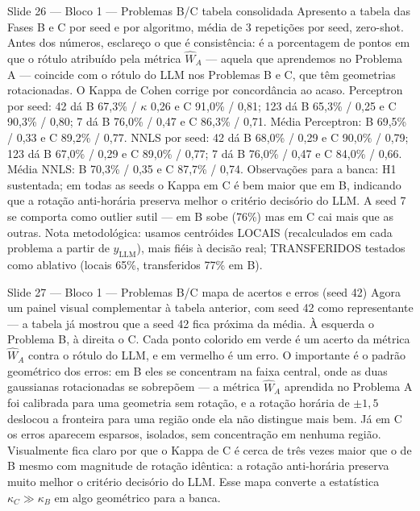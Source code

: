 \documentclass[aspectratio=169,10pt]{beamer}
\begin{document}
\begin{frame}{Slide 26 --- Bloco 1 --- Problemas B/C tabela consolidada}
\footnotesize
Apresento a tabela das Fases B e C por seed e por algoritmo, m\'edia de 3 repeti\c{c}\~oes por seed, zero-shot. Antes dos n\'umeros, esclare\c{c}o o que \'e consist\^encia: \'e a porcentagem de pontos em que o r\'otulo atribu\'ido pela m\'etrica $\hat W_A$ --- aquela que aprendemos no Problema A --- coincide com o r\'otulo do LLM nos Problemas B e C, que t\^em geometrias rotacionadas. O Kappa de Cohen corrige por concord\^ancia ao acaso. Perceptron por seed: 42 d\'a B 67,3\% / $\kappa$ 0,26 e C 91,0\% / 0,81; 123 d\'a B 65,3\% / 0,25 e C 90,3\% / 0,80; 7 d\'a B 76,0\% / 0,47 e C 86,3\% / 0,71. M\'edia Perceptron: B 69,5\% / 0,33 e C 89,2\% / 0,77. NNLS por seed: 42 d\'a B 68,0\% / 0,29 e C 90,0\% / 0,79; 123 d\'a B 67,0\% / 0,29 e C 89,0\% / 0,77; 7 d\'a B 76,0\% / 0,47 e C 84,0\% / 0,66. M\'edia NNLS: B 70,3\% / 0,35 e C 87,7\% / 0,74. Observa\c{c}\~oes para a banca: H1 sustentada; em todas as seeds o Kappa em C \'e bem maior que em B, indicando que a rota\c{c}\~ao anti-hor\'aria preserva melhor o crit\'erio decis\'orio do LLM. A seed 7 se comporta como outlier sutil --- em B sobe (76\%) mas em C cai mais que as outras. Nota metodol\'ogica: usamos centr\'oides LOCAIS (recalculados em cada problema a partir de $y_{\text{LLM}}$), mais fi\'eis \`a decis\~ao real; TRANSFERIDOS testados como ablativo (locais 65\%, transferidos 77\% em B).
\end{frame}

\begin{frame}{Slide 27 --- Bloco 1 --- Problemas B/C mapa de acertos e erros (seed 42)}
\footnotesize
Agora um painel visual complementar \`a tabela anterior, com seed 42 como representante --- a tabela j\'a mostrou que a seed 42 fica pr\'oxima da m\'edia. \`A esquerda o Problema B, \`a direita o C. Cada ponto colorido em verde \'e um acerto da m\'etrica $\hat W_A$ contra o r\'otulo do LLM, e em vermelho \'e um erro. O importante \'e o padr\~ao geom\'etrico dos erros: em B eles se concentram na faixa central, onde as duas gaussianas rotacionadas se sobrep\~oem --- a m\'etrica $\hat W_A$ aprendida no Problema A foi calibrada para uma geometria sem rota\c{c}\~ao, e a rota\c{c}\~ao hor\'aria de $\pm 1{,}5$ deslocou a fronteira para uma regi\~ao onde ela n\~ao distingue mais bem. J\'a em C os erros aparecem esparsos, isolados, sem concentra\c{c}\~ao em nenhuma regi\~ao. Visualmente fica claro por que o Kappa de C \'e cerca de tr\^es vezes maior que o de B mesmo com magnitude de rota\c{c}\~ao id\^entica: a rota\c{c}\~ao anti-hor\'aria preserva muito melhor o crit\'erio decis\'orio do LLM. Esse mapa converte a estat\'istica $\kappa_C \gg \kappa_B$ em algo geom\'etrico para a banca.
\end{frame}
\end{document}
